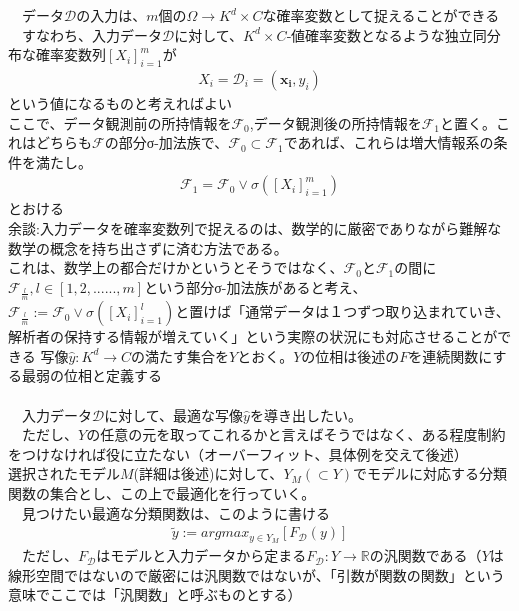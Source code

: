 \documentclass{jsarticle}
\begin{document}
　データ$\mathcal{D}$の入力は、$m$個の$\Omega\rightarrow K^d\times C$な確率変数として捉えることができる\\
　すなわち、入力データ$\mathcal{D}$に対して、$K^d\times C$‐値確率変数となるような独立同分布な確率変数列$[X_i]^m_{i=1}$が
\begin{eqnarray}
X_i=\mathcal{D}_i=(\bm{x_i},y_i)
\end{eqnarray}
という値になるものと考えればよい\\
 ここで、データ観測前の所持情報を$\mathcal{F}_0$,データ観測後の所持情報を$\mathcal{F}_1$と置く。これはどちらも$\mathcal{F}$の部分σ-加法族で、$\mathcal{F}_0\subset\mathcal{F}_1$であれば、これらは増大情報系の条件を満たし。\\
\begin{eqnarray}
\mathcal{F}_1=\mathcal{F}_0\vee\sigma([X_i]^m_{i=1})
\end{eqnarray}
とおける\\
余談:入力データを確率変数列で捉えるのは、数学的に厳密でありながら難解な数学の概念を持ち出さずに済む方法である。\\
これは、数学上の都合だけかというとそうではなく、$\mathcal{F}_0$と$\mathcal{F}_1$の間に$\mathcal{F}_{\frac{l}{m}},l\in[1,2,......,m]$という部分σ-加法族があると考え、$\mathcal{F}_{\frac{l}{m}}:=\mathcal{F}_0\vee\sigma([X_i]^l_{i=1})$と置けば「通常データは１つずつ取り込まれていき、解析者の保持する情報が増えていく」という実際の状況にも対応させることができる
\newpage
写像$\hat{y}:K^d\rightarrow C$の満たす集合を$Y$とおく。$Y$の位相は後述の$F$を連続関数にする最弱の位相と定義する\\
　\\ 
　入力データ$\mathcal{D}$に対して、最適な写像$\hat{y}$を導き出したい。\\
　ただし、$Y$の任意の元を取ってこれるかと言えばそうではなく、ある程度制約をつけなければ役に立たない（オーバーフィット、具体例を交えて後述）\\
選択されたモデル$M$(詳細は後述)に対して、$Y_M(\subset Y)$でモデルに対応する分類関数の集合とし、この上で最適化を行っていく。\\
　見つけたい最適な分類関数は、このように書ける
\begin{eqnarray}
\tilde{y}:=argmax_{y\in Y_M}[F_\mathcal{D}(y)]
\end{eqnarray}
　ただし、$F_\mathcal{D}$はモデルと入力データから定まる$F_\mathcal{D}:Y\rightarrow\mathbb{R}$の汎関数である（$Y$は線形空間ではないので厳密には汎関数ではないが、「引数が関数の関数」という意味でここでは「汎関数」と呼ぶものとする）\\
\end{document}
